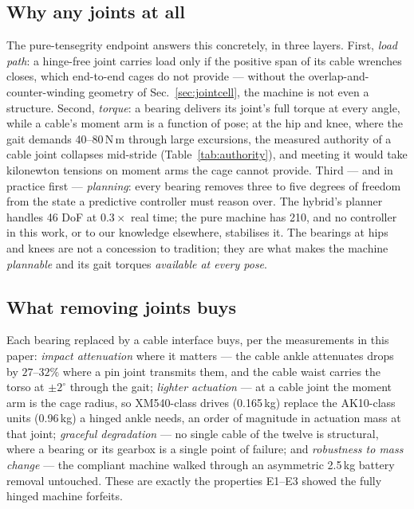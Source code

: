 \documentclass[conference]{IEEEtran}
\begin{document}
\subsection{Why any joints at all}
The pure-tensegrity endpoint answers this concretely, in three layers. First,
\emph{load path}: a hinge-free joint carries load only if the positive span
of its cable wrenches closes, which end-to-end cages do not provide ---
without the overlap-and-counter-winding geometry of
Sec.~\ref{sec:jointcell}, the machine is not even a structure. Second,
\emph{torque}: a bearing delivers its joint's full torque at every angle,
while a cable's moment arm is a function of pose; at the hip and knee, where
the gait demands 40--80\,N\,m through large excursions, the measured
authority of a cable joint collapses mid-stride
(Table~\ref{tab:authority}), and meeting it would take kilonewton tensions
on moment arms the cage cannot provide. Third --- and in practice first ---
\emph{planning}: every bearing removes three to five degrees of freedom from
the state a predictive controller must reason over. The hybrid's planner
handles 46 DoF at $0.3\times$ real time; the pure machine has 210, and no
controller in this work, or to our knowledge elsewhere, stabilises it. The
bearings at hips and knees are not a concession to tradition; they are what
makes the machine \emph{plannable} and its gait torques \emph{available at
every pose}.

\subsection{What removing joints buys}
Each bearing replaced by a cable interface buys, per the measurements in this
paper: \emph{impact attenuation} where it matters --- the cable ankle
attenuates drops by $27$--$32\%$ where a pin joint transmits them, and the
cable waist carries the torso at $\pm2^\circ$ through the gait; \emph{lighter
actuation} --- at a cable joint the moment arm is the cage radius, so
XM540-class drives (0.165\,kg) replace the AK10-class units (0.96\,kg) a
hinged ankle needs, an order of magnitude in actuation mass at that joint;
\emph{graceful degradation} --- no single cable of the twelve is structural,
where a bearing or its gearbox is a single point of failure; and
\emph{robustness to mass change} --- the compliant machine walked through an
asymmetric 2.5\,kg battery removal untouched. These are exactly the
properties E1--E3 showed the fully hinged machine forfeits.
\end{document}
